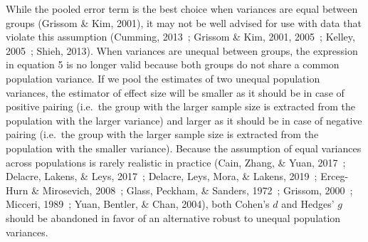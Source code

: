 \documentclass[
  12pt,
  french,
]{article}
\begin{document}
While the pooled error term is the best choice when variances are equal
between groups (Grissom \& Kim, 2001), it may not be well advised for
use with data that violate this assumption (Cumming, 2013~; Grissom \&
Kim, 2001, 2005~; Kelley, 2005~; Shieh, 2013). When variances are
unequal between groups, the expression in equation 5 is no longer valid
because both groups do not share a common population variance. If we
pool the estimates of two unequal population variances, the estimator of
effect size will be smaller as it should be in case of positive pairing
(i.e.~the group with the larger sample size is extracted from the
population with the larger variance) and larger as it should be in case
of negative pairing (i.e.~the group with the larger sample size is
extracted from the population with the smaller variance). Because the
assumption of equal variances across populations is rarely realistic in
practice (Cain, Zhang, \& Yuan, 2017~; Delacre, Lakens, \& Leys, 2017~;
Delacre, Leys, Mora, \& Lakens, 2019~; Erceg-Hurn \& Mirosevich, 2008~;
Glass, Peckham, \& Sanders, 1972~; Grissom, 2000~; Micceri, 1989~; Yuan,
Bentler, \& Chan, 2004), both Cohen's \(d\) and Hedges' \(g\) should be
abandoned in favor of an alternative robust to unequal population
variances.
\end{document}
